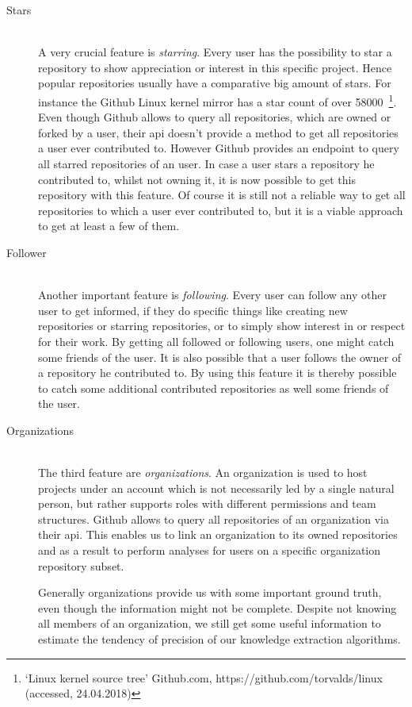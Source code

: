 \begin{description}
    \item[Stars] \hfill \\
        A very crucial feature is \emph{starring}. Every user has the possibility to star a repository to show appreciation or interest in this specific project.
        Hence popular repositories usually have a comparative big amount of stars. For instance the Github Linux kernel mirror has a star count of over 58000~\footnote{`Linux kernel source tree' Github.com, https://github.com/torvalds/linux (accessed, 24.04.2018)}.
        Even though Github allows to query all repositories, which are owned or forked by a user, their \ac{api} doesn't provide a method to get all repositories a user ever contributed to.
        However Github provides an endpoint to query all starred repositories of an user.
        In case a user stars a repository he contributed to, whilst not owning it, it is now possible to get this repository with this feature.
        Of course it is still not a reliable way to get all repositories to which a user ever contributed to, but it is a viable approach to get at least a few of them.

    \item[Follower] \hfill \\
        Another important feature is \emph{following}.
        Every user can follow any other user to get informed, if they do specific things like creating new repositories or starring repositories, or to simply show interest in or respect for their work.
        By getting all followed or following users, one might catch some friends of the user.
        It is also possible that a user follows the owner of a repository he contributed to.
        By using this feature it is thereby possible to catch some additional contributed repositories as well some friends of the user.

    \item[Organizations] \hfill \\
        The third feature are \emph{organizations}.
        An organization is used to host projects under an account which is not necessarily led by a single natural person, but rather supports roles with different permissions and team structures.
        Github allows to query all repositories of an organization via their \ac{api}.
        This enables us to link an organization to its owned repositories and as a result to perform analyses for users on a specific organization repository subset.

        Generally organizations provide us with some important ground truth, even though the information might not be complete.
        Despite not knowing all members of an organization, we still get some useful information to estimate the tendency of precision of our knowledge extraction algorithms.
\end{description}
